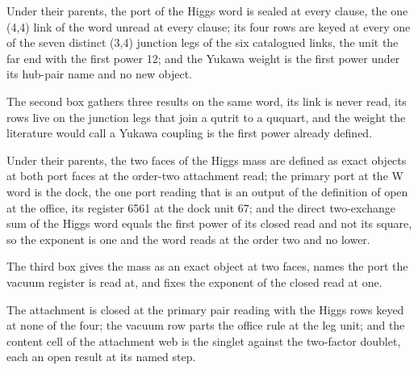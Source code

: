 \begin{chconditional}\label{box:VI-10-higgs-the-closed-hub-read-its-rows-its-mass-and-its-exponent:2}
Under their parents, the port of the Higgs word is sealed at every clause, the one (4,4) link of the word unread at every clause; its four rows are keyed at every one of the seven distinct (3,4) junction legs of the six catalogued links, the unit the far end with the first power 12; and the Yukawa weight is the first power under its hub-pair name and no new object.
\end{chconditional}
The second box gathers three results on the same word, its link is never read, its rows live on the junction legs that join a qutrit to a ququart, and the weight the literature would call a Yukawa coupling is the first power already defined.
\begin{chconditional}\label{box:VI-10-higgs-the-closed-hub-read-its-rows-its-mass-and-its-exponent:3}
Under their parents, the two faces of the Higgs mass are defined as exact objects at both port faces at the order-two attachment read; the primary port at the W word is the dock, the one port reading that is an output of the definition of open at the office, its register 6561 at the dock unit 67; and the direct two-exchange sum of the Higgs word equals the first power of its closed read and not its square, so the exponent is one and the word reads at the order two and no lower.
\end{chconditional}
The third box gives the mass as an exact object at two faces, names the port the vacuum register is read at, and fixes the exponent of the closed read at one.
\begin{chwall}\label{box:VI-10-higgs-the-closed-hub-read-its-rows-its-mass-and-its-exponent:4}
The attachment is closed at the primary pair reading with the Higgs rows keyed at none of the four; the vacuum row parts the office rule at the leg unit; and the content cell of the attachment web is the singlet against the two-factor doublet, each an open result at its named step.
\end{chwall}
